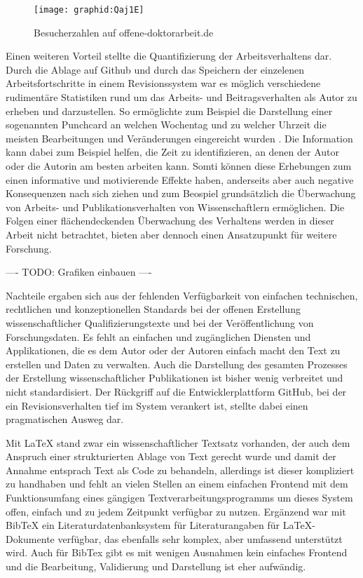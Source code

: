 \begin{figure}[h!]
\texttt{[image: graphid:Qaj1E]}
\caption{Besucherzahlen auf offene-doktorarbeit.de}
\end{figure}

Einen weiteren Vorteil stellte die Quantifizierung der Arbeitsverhaltens dar. Durch die Ablage auf Github und durch das Speichern der einzelenen Arbeitsfortschritte in einem Revisionssystem war es möglich verschiedene rudimentäre Statistiken rund um das Arbeits- und Beitragsverhalten als Autor zu erheben und darzustellen. So ermöglichte zum Beispiel die Darstellung einer sogenannten Punchcard an welchen Wochentag und zu welcher Uhrzeit die meisten Bearbeitungen und Veränderungen eingereicht wurden . Die Information kann dabei zum Beispiel helfen, die Zeit zu identifizieren, an denen der Autor oder die Autorin am besten arbeiten kann. Somti können diese Erhebungen zum einen informative und motivierende Effekte haben, anderseits aber auch negative Konsequenzen nach sich ziehen und zum Beospiel grundsätzlich die Überwachung von Arbeits- und Publikationsverhalten von Wissenschaftlern ermöglichen. Die Folgen einer flächendeckenden Überwachung des Verhaltens werden in dieser Arbeit nicht betrachtet, bieten aber dennoch einen Ansatzupunkt für weitere Forschung.

---- TODO: Grafiken einbauen ----

Nachteile ergaben sich aus der fehlenden Verfügbarkeit von einfachen technischen, rechtlichen und konzeptionellen Standards bei der offenen Erstellung wissenschaftlicher Qualifizierungstexte und bei der Veröffentlichung von Forschungsdaten. Es fehlt an einfachen und zugänglichen Diensten und Applikationen, die es dem Autor oder der Autoren einfach macht den Text zu erstellen und Daten zu verwalten. Auch die Darstellung des gesamten Prozesses der Erstellung wissenschaftlicher Publikationen ist bisher wenig verbreitet und nicht standardisiert. Der Rückgriff auf die Entwicklerplattform GitHub, bei der ein Revisionsverhalten tief im System verankert ist, stellte dabei einen pragmatischen Ausweg dar.

Mit LaTeX stand zwar ein wissenschaftlicher Textsatz vorhanden, der auch dem Anspruch einer strukturierten Ablage von Text gerecht wurde und damit der Annahme entsprach Text als Code zu behandeln, allerdings ist dieser kompliziert zu handhaben und fehlt an vielen Stellen an einem einfachen Frontend mit dem Funktionsumfang eines gängigen Textverarbeitungsprogramms um dieses System offen, einfach und zu jedem Zeitpunkt verfügbar zu nutzen. Ergänzend war mit BibTeX ein Literaturdatenbanksystem für Literaturangaben für LaTeX-Dokumente verfügbar, das ebenfalls sehr komplex, aber umfassend unterstützt wird. Auch für BibTex gibt es mit wenigen Ausnahmen kein einfaches Frontend und die Bearbeitung, Validierung und Darstellung ist eher aufwändig.


